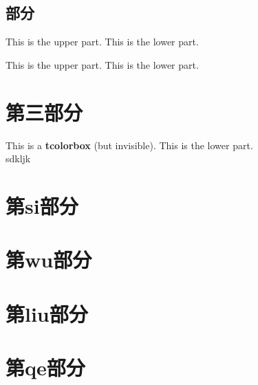 \documentclass{beamer}
\begin{document}
	\subsection{部分}
	\begin{frame}
		\begin{tcolorbox}[title=Lower separated] This is the upper part.
			\tcblower
			This is the lower part.
		\end{tcolorbox}
	
		\begin{tcolorbox}[sidebyside,title=Lower separated]
			This is the upper part.
			\tcblower
			This is the lower part.
		\end{tcolorbox}
	\end{frame}	

	\section{第三部分}
	\begin{frame}
		\begin{tcolorbox}[upperbox=invisible,colback=white]
			This is a \textbf{tcolorbox} (but invisible).
			\tcblower
			This is the lower part.\\
			sdkljk
		\end{tcolorbox}
	\end{frame}
	\section{第si部分}
	\section{第wu部分}
	\section{第liu部分}
	\section{第qe部分}
	
\end{document}
